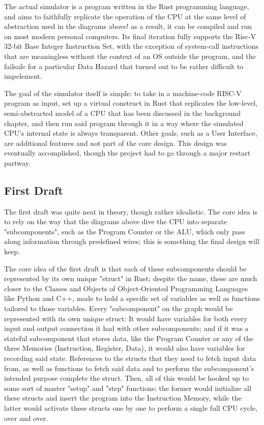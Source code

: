 \documentclass[12pt,twoside]{reedthesis}
\begin{document}
The actual simulator is a program written in the Rust programming language, and aims to faithfully replicate the operation of the CPU at the same level of abstraction used in the diagrams above! as a result, it can be compiled and run on most modern personal computers. Its final iteration fully supports the Risc-V 32-bit Base Integer Instruction Set, with the exception of system-call instructions that are meaningless without the context of an OS outside the program, and the failsafe for a particular Data Hazard that turned out to be rather difficult to impelement.

The goal of the simulator itself is simple: to take in a machine-code RISC-V program as input, set up a virtual construct in Rust that replicates the low-level, semi-abstracted model of a CPU that has been discussed in the background chapter, and then run said program through it in a way where the simulated CPU's internal state is always transparent. Other goals, such as a User Interface, are additional features and not part of the core design. This design was eventually accomplished, though the project had to go through a major restart partway.

\subsection*{First Draft}

The first draft was quite neat in theory, though rather idealistic. The core idea is to rely on the way that the diagrams above dive the CPU into separate "subcomponents", such as the Program Counter or the ALU, which only pass along information through predefined wires; this is something the final design will keep.

The core idea of the first draft is that each of these subcomponents should be represented by its own unique "struct" in Rust; despite the name, these are much closer to the Classes and Objects of Object-Oriented Programming Languages like Python and C++, made to hold a specific set of variables as well as functions tailored to those variables. Every "subcomponent" on the graph would be represented with its own unique struct: It would have variables for both every input and output connection it had with other subcomponents; and if it was a stateful subcomponent that stores data, like the Program Counter or any of the three Memories (Instruction, Register, Data), it would also have variables for recording said state. References to the structs that they need to fetch input data from, as well as functions to fetch said data and to perform the subcomponent's intended purpose complete the struct. Then, all of this would be hooked up to some sort of master "setup" and "step" functions; the former would initialize all these structs and insert the program into the Instruction Memory, while the latter would activate these structs one by one to perform a single full CPU cycle, over and over.
\end{document}
